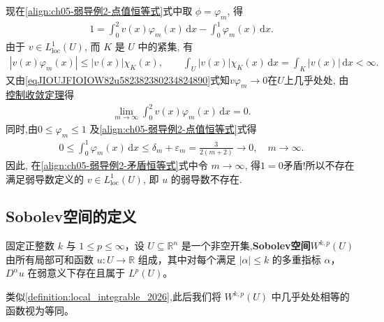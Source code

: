\documentclass[../../main.tex]{subfiles}
\begin{document}
\begin{solution}
现在\eqref{align:ch05-弱导例2-点值恒等式}式中取
$\phi=\varphi_m$, 得
\begin{align}
1=\int_0^2v(x)\varphi_m(x)\,\mathrm{d}x
-\int_0^1\varphi_m(x)\,\mathrm{d}x.
\label{align:ch05-弱导例2-矛盾恒等式}
\end{align}
由于 $v\in L_{\mathrm{loc}}^1(U)$, 而 $K$ 是 $U$ 中的紧集, 有
\begin{align*}
|v(x)\varphi_m(x)|
\leqslant|v(x)|\chi_K(x),\qquad
\int_U|v(x)|\chi_K(x)\,\mathrm{d}x
=\int_K|v(x)|\,\mathrm{d}x<\infty.
\end{align*}
又由\eqref{eqJIOUJFIOIOW82u582382380234824890}式知$v\varphi_m\to0$在$U$上几乎处处, 由\hyperref[Real Analysis-theorem:控制收敛定理]{控制收敛定理}得
\begin{align*}
\lim\limits_{m\to\infty}
\int_0^2v(x)\varphi_m(x)\,\mathrm{d}x=0.
\end{align*}
同时,由$0\leqslant\varphi_m\leqslant1$ 及\eqref{align:ch05-弱导例2-点值恒等式}式得
\begin{align*}
0\leqslant\int_0^1\varphi_m(x)\,\mathrm{d}x
\leqslant\delta_m+\varepsilon_m
=\frac{3}{2(m+2)}
\longrightarrow0,\quad m\to \infty.
\end{align*}
因此, 在\eqref{align:ch05-弱导例2-矛盾恒等式}式中令
$m\to\infty$, 得$1=0$矛盾!所以不存在满足弱导数定义的
$v\in L_{\mathrm{loc}}^1(U)$, 即 $u$ 的弱导数不存在.
\end{solution}

\subsection{Sobolev空间的定义}\label{subsection:ch05-Sobolev空间定义}

\begin{definition}\label{definition:ch05-Wkp}
固定正整数 $k$ 与 $1\leqslant p\leqslant \infty$，设 $U \subseteq \mathbb{R}^n$ 是一个非空开集,\textbf{Sobolev空间}$W^{k,p}(U)$由所有局部可和函数 $u:U\to\mathbb{R}$ 组成，其中对每个满足 $|\alpha|\leqslant k$ 的多重指标 $\alpha$，$D^{\alpha}u$ 在弱意义下存在且属于 $L^{p}(U)$。
\end{definition}
\begin{remark}
类似\cref{definition:local_integrable_2026},此后我们将 $W^{k,p}(U)$ 中几乎处处相等的函数视为等同。
\end{remark}
\end{document}
